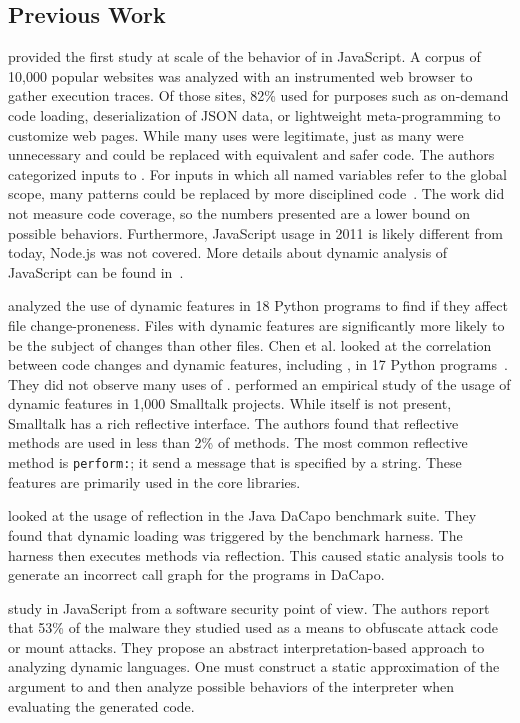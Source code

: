 \documentclass[review,screen,acmsmall]{acmart}%
\renewcommand{\k}[1]{\lstinline |#1|\xspace}
\begin{document}
\subsection{Previous Work}

\citet{ecoop11} provided the first study at scale of the behavior of \eval in
JavaScript. A corpus of 10,000 popular websites was analyzed with an
instrumented web browser to gather execution traces. Of those sites, 82\% used
\eval for purposes such as on-demand code loading, deserialization of JSON data,
or lightweight meta-programming to customize web pages. While many uses were
legitimate, just as many were unnecessary and could be replaced with equivalent
and safer code. The authors categorized inputs to \eval. For inputs in
which all named variables refer to the global scope, many patterns could be
replaced by more disciplined code~\cite{oopsla12b, moller12}. The work did not
measure code coverage, so the numbers presented are a lower bound on possible
behaviors. Furthermore, JavaScript usage in 2011 is likely different from today,
\eg Node.js was not covered. More details about dynamic analysis of JavaScript
can be found in~\cite{liang}.

\citet{wang} analyzed the use of dynamic features in 18 Python programs to find if
they affect file change-proneness. Files with dynamic features are significantly
more likely to be the subject of changes than other files. Chen et al. looked
at the correlation between code changes and dynamic features, including \eval,
in 17 Python programs~\cite{chen}. They did not observe many uses of \eval.
\citet{oscar} performed an empirical study of the usage of dynamic features in
1,000 Smalltalk projects. While \eval itself is not present, Smalltalk has a
rich reflective interface. The authors found that reflective methods are used in less
than 2\% of methods. The most common reflective method is \k{perform:}; it send
a message that is specified by a string. These features are primarily used in the
core libraries.

\citet{bodden} looked at the usage of reflection in the Java DaCapo benchmark suite.
They found that dynamic loading was triggered by the benchmark harness. The
harness then executes methods via reflection. This caused static analysis tools
to generate an incorrect call graph for the programs in DaCapo.

\citet{Arceri21} study \eval in JavaScript from a software security point of
view. The authors report that 53\% of the malware they studied used \eval as a
means to obfuscate attack code or mount attacks. They propose an abstract
interpretation-based approach to analyzing dynamic languages. One must construct
a static approximation of the argument to \eval and then analyze possible
behaviors of the interpreter when evaluating the generated code.
\end{document}
